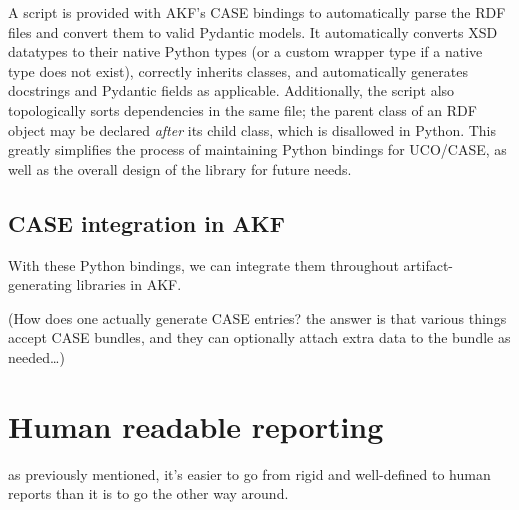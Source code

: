 A script is provided with AKF's CASE bindings to automatically parse the
RDF files and convert them to valid Pydantic models. It automatically
converts XSD datatypes to their native Python types (or a custom wrapper
type if a native type does not exist), correctly inherits classes, and
automatically generates docstrings and Pydantic fields as applicable.
Additionally, the script also topologically sorts dependencies in the
same file; the parent class of an RDF object may be declared
\emph{after} its child class, which is disallowed in Python. This
greatly simplifies the process of maintaining Python bindings for
UCO/CASE, as well as the overall design of the library for future needs.

\subsection{CASE integration in
AKF}\label{case-integration-in-akf}

With these Python bindings, we can integrate them throughout
artifact-generating libraries in AKF.

(How does one actually generate CASE entries? the answer is that various
things accept CASE bundles, and they can optionally attach extra data to
the bundle as needed\ldots)

\section{Human readable reporting}\label{human-readable-reporting}

as previously mentioned, it's easier to go from rigid and well-defined
to human reports than it is to go the other way around.
